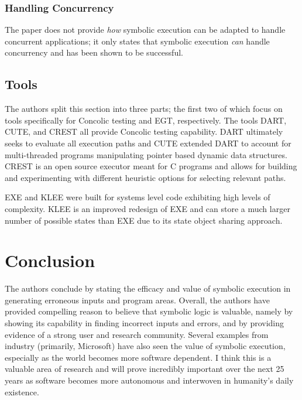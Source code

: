 \documentclass[11pt, journal]{IEEEtran}
\begin{document}
\subsubsection{Handling Concurrency}
The paper does not provide \textit{how} symbolic execution can be adapted to handle concurrent applications; it only states that symbolic execution \textit{can} handle concurrency and has been shown to be successful. 
\subsection{Tools}
The authors split this section into three parts; the first two of which focus on tools specifically for Concolic testing and EGT, respectively. The tools DART, CUTE, and CREST all provide Concolic testing capability. DART ultimately seeks to evaluate all execution paths and CUTE extended DART to account for multi-threaded programs manipulating pointer based dynamic data structures. CREST is an open source executor meant for C programs and allows for building and experimenting with different heuristic options for selecting relevant paths.

EXE and KLEE were built for systems level code exhibiting high levels of complexity. KLEE is an improved redesign of EXE and can store a much larger number of possible states than EXE due to its state object sharing approach. 
\section{Conclusion}
The authors conclude by stating the efficacy and value of symbolic execution in generating erroneous inputs and program areas. Overall, the authors have provided compelling reason to believe that symbolic logic is valuable, namely by showing its capability in finding incorrect inputs and errors, and by providing evidence of a strong user and research community. Several examples from industry (primarily, Microsoft) have also seen the value of symbolic execution, especially as the world becomes more software dependent. I think this is a valuable area of research and will prove incredibly important over the next 25 years as software becomes more autonomous and interwoven in humanity's daily existence.



\end{document}
